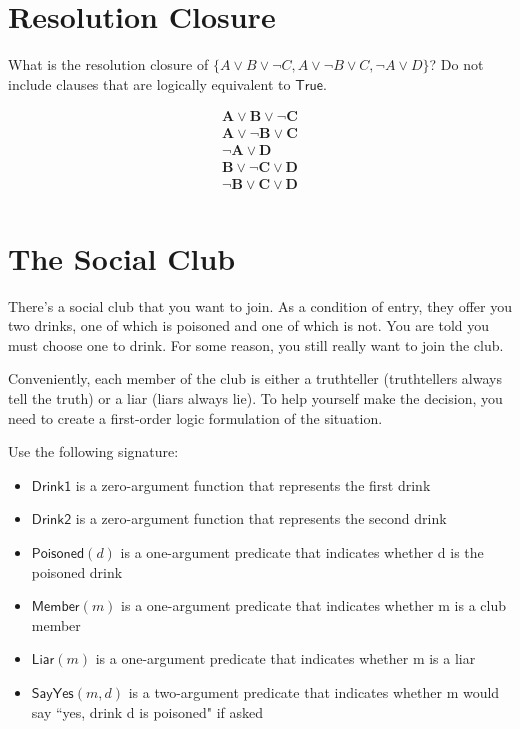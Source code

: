 \documentclass{article}
\begin{document}
\section{Resolution Closure}

What is the resolution closure of $\{ A \lor B \lor \lnot C, A \lor \lnot B \lor C, \lnot A \lor D \}$? Do not include clauses that are logically equivalent to $\mathsf{True}$.

\begin{gather*}
\mathbf{A \lor B \lor \lnot C}\\
\mathbf{A \lor \lnot B \lor C} \\
\mathbf{\lnot A \lor D}\\
\mathbf{B \lor \lnot C \lor D}\\
\mathbf{\lnot B \lor C \lor D}\\
\end{gather*}

\section{The Social Club}

There's a social club that you want to join. As a condition of entry, they offer you two drinks, one of which is poisoned and one of which is not. You are told you must choose one to drink. For some reason, you still really want to join the club.

Conveniently, each member of the club is either a truthteller (truthtellers always tell the truth) or a liar (liars always lie). To help yourself make the decision, you need to create a first-order logic formulation of the situation.

Use the following signature:

\begin{itemize}
	\item $\mathsf{Drink1}$ is a zero-argument function that represents the first drink
	\item $\mathsf{Drink2}$ is a zero-argument function that represents the second drink
	\item $\mathsf{Poisoned}(d)$ is a one-argument predicate that indicates whether d is the poisoned drink
	\item $\mathsf{Member}(m)$ is a one-argument predicate that indicates whether m is a club member
	\item $\mathsf{Liar}(m)$ is a one-argument predicate that indicates whether m is a liar
	\item $\mathsf{SayYes}(m, d)$ is a two-argument predicate that indicates whether m would say ``yes, drink d is poisoned" if asked
\end{itemize}
\end{document}
